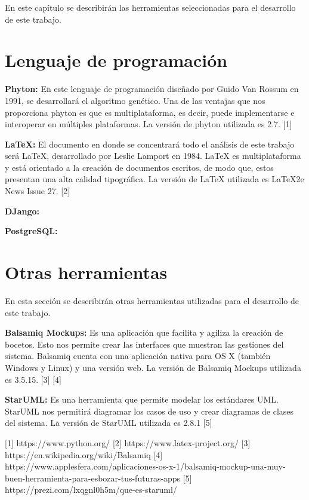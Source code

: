 \label{sec:seleccionHerramientas}
	
	En este capítulo se describirán las herramientas seleccionadas para el desarrollo de este trabajo. 
	
	\section{Lenguaje de programación}
		\textbf{Phyton:} En este lenguaje de programación diseñado por Guido Van Rossum en 1991, se desarrollará el algoritmo genético. Una de las ventajas que nos proporciona phyton es que es multiplataforma, es decir, puede implementarse e interoperar en múltiples plataformas. La versión de phyton utilizada es 2.7. [1] 
	
		\textbf{LaTeX:} El documento en donde se concentrará todo el análisis de este trabajo será LaTeX, desarrollado por Leslie Lamport en 1984. LaTeX es multiplataforma y está orientado a la creación de documentos escritos, de modo que, estos  presentan una alta calidad tipográfica. La versión de LaTeX utilizada es LaTeX2e News Issue 27. [2]
		
		\textbf{DJango:}
		
		\textbf{PostgreSQL:}
	
	\section{Otras herramientas}
		En esta sección se describirán otras herramientas utilizadas para el desarrollo de este trabajo.
		
		\textbf{Balsamiq Mockups:} Es una aplicación que facilita y agiliza la creación de bocetos. Esto nos permite crear las interfaces que muestran las gestiones del sistema. Balsamiq cuenta con una aplicación nativa para OS X (también Windows y Linux) y una versión web. La versión de Balsamiq Mockups utilizada es 3.5.15. [3] [4]
		
		\textbf{StarUML:} Es una herramienta que permite modelar los estándares UML. StarUML nos permitirá diagramar los casos de uso y crear diagramas de clases del sistema. La versión de StarUML utilizada es 2.8.1 [5]
		
		
	
	


[1] https://www.python.org/
[2] https://www.latex-project.org/
[3] https://en.wikipedia.org/wiki/Balsamiq 
[4] https://www.applesfera.com/aplicaciones-os-x-1/balsamiq-mockup-una-muy-buen-herramienta-para-esbozar-tus-futuras-apps
[5] https://prezi.com/lxqgnl0h5m/que-es-staruml/
